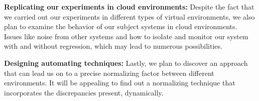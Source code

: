 \textbf{Replicating our experiments in cloud environments:}
Despite the fact that we carried out our experiments in different types of virtual environments, we also plan to examine the behavior of our subject systems in cloud environments. Issues like noise from other systems and how to isolate and monitor our system with and without regression, which may lead to numerous possibilities.


\textbf{Designing automating techniques:}
Lastly, we plan to discover an approach that can lead us on to a precise normalizing factor between different environments. It will be appealing to find out a normalizing technique that incorporates the discrepancies present, dynamically.
